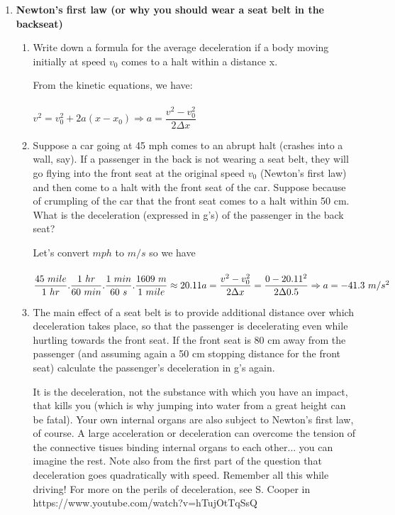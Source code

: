\documentclass[fleqn]{article}
\begin{document}
\begin{enumerate}
\begin{enumerate}
    \end{enumerate}
    
    \item \textbf{Newton’s first law (or why you should wear a seat belt in the backseat)}
    \begin{enumerate}
      \item Write down a formula for the average deceleration if a body moving initially at speed $v_0$ comes to a halt within a distance x.

        \textcolor{hwColor}{
          From the kinetic equations, we have: \\
          \\
          $
            v^2=v_0^2+2a(x-x_0) \Rightarrow a=\dfrac{v^2-v_0^2}{2\Delta x}
          $
        }

      \item Suppose a car going at 45 mph comes to an abrupt halt (crashes into a wall, say). If a passenger in the back is not wearing a seat
      belt, they will go flying into the front seat at the original speed $v_0$ (Newton’s first law) and then come to a halt with the front
      seat of the car. Suppose because of crumpling of the car that the front seat comes to a halt within 50 cm. What is the deceleration
      (expressed in g’s) of the passenger in the back seat?

      \textcolor{hwColor}{
        Let's convert $mph$ to $m/s$ so we have \\
        \\
        $
          \dfrac{45 ~ mile}{1 ~ hr}.\dfrac{1 ~ hr}{60 ~ min}.\dfrac{1 ~ min}{ 60 ~ s}.\dfrac{1609 ~ m}{1 ~ mile} \approx 20.11 \\
          \\
          a=\dfrac{v^2-v_0^2}{2\Delta x}=\dfrac{0-20.11^2}{2\Delta 0.5} \Rightarrow a=-41.3 ~ m/s^2
        $
      }

      \item The main effect of a seat belt is to provide additional distance
      over which deceleration takes place, so that the passenger is decelerating even while hurtling towards the front seat. If the front
      seat is 80 cm away from the passenger (and assuming again a 50 cm stopping distance for the front seat) calculate the passenger’s
      deceleration in g’s again.

      It is the deceleration, not the substance with which you have an impact,
      that kills you (which is why jumping into water from a great height can
      be fatal). Your own internal organs are also subject to Newton’s first
      law, of course. A large acceleration or deceleration can overcome the
      tension of the connective tisues binding internal organs to each other...
      you can imagine the rest. Note also from the first part of the question
      that deceleration goes quadratically with speed. Remember all this
      while driving!
      For more on the perils of deceleration, see S. Cooper in
      https://www.youtube.com/watch?v=hTujOtTqSsQ


\end{enumerate}
\end{enumerate}
\end{document}
